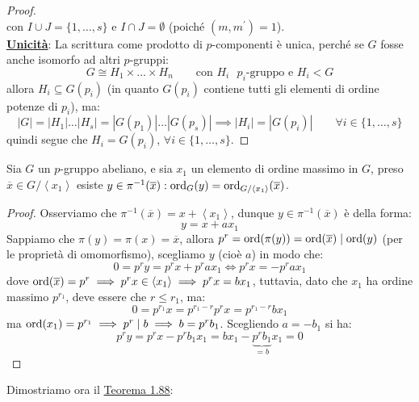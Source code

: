 \documentclass[11pt]{scrartcl}
\begin{document}
\begin{proof}
\[                \]
        con $I \cup J = \{1,\ldots,s\}$ e $I \cap J = \emptyset$ (poiché $(m,m^{\prime}) = 1$). \\
        \underline{\textbf{Unicità}}: La scrittura come prodotto di $p$-componenti è unica, perché se $G$ fosse anche isomorfo ad altri $p$-gruppi:
            \[ G \cong H_1 \times \ldots \times H_n \qquad \text{con $H_i$ $p_i$-gruppo e $H_i<G$}
                \]
        allora $H_i \subseteq G(p_i)$ (in quanto $G(p_i)$ contiene tutti gli elementi di ordine potenze di $p_i$), ma:
            \[ |G| = |H_1| \ldots |H_s| = |G(p_1)| \ldots |G(p_s)| \implies |H_i| = |G(p_i)| \qquad \forall i \in \{1,\ldots,s\}
                \]
        quindi segue che $H_i = G(p_i)$, $\forall i \in \{1,\ldots,s\}$. 
\end{proof}

\begin{lemma}
    \label{l:1.91}
    Sia $G$ un $p$-gruppo abeliano, e sia $x_1$ un elemento di ordine massimo in $G$, preso $\overline x \in G/\left<x_1\right>$
     esiste $y \in \pi^{-1}(\overline x) : \operatorname{ord}_G(y) = \operatorname{ord}_{G/\left<x_1\right>}(\overline x)$.
\end{lemma}

\begin{proof}
    Osserviamo che $\pi^{-1}(\overline x) = x + \left<x_1\right>$, dunque $y \in \pi^{-1}(\overline x)$ è della forma:
        \[ y = x + ax_1
            \]
    Sappiamo che $\pi(y) = \pi(x) = \overline x$, allora $p^r = \operatorname{ord}(\pi(y)) = \operatorname{ord}(\overline x) \mid \operatorname{ord}(y)$ (per le proprietà di omomorfismo), scegliamo $y$ (cioè $a$) in modo che:
        \[ 0 = p^ry = p^rx + p^rax_1 \iff p^rx = -p^rax_1 
            \]
    dove $\operatorname{ord}(\overline x) = p^r \implies p^rx \in \left<x_1\right> \implies p^rx = bx_1$, tuttavia, dato che $x_1$ ha ordine massimo $p^{r_1}$, deve essere che $r \leq r_1$, ma:
        \[ 0 = p^{r_1}x = p^{r_1 - r}p^rx = p^{r_1 - r}bx_1
            \]  
    ma $\operatorname{ord}(x_1) = p^{r_1} \implies p^r \mid b \implies b = p^rb_1$. Scegliendo $a = -b_1$ si ha:
        \[ p^ry = p^rx - p^rb_1x_1 = bx_1 - \underbrace{p^rb_1}_{= b}x_1 = 0
            \]
\end{proof}

\pagebreak

Dimostriamo ora il \hyperref[t:t2]{Teorema 1.88}:
\end{document}
